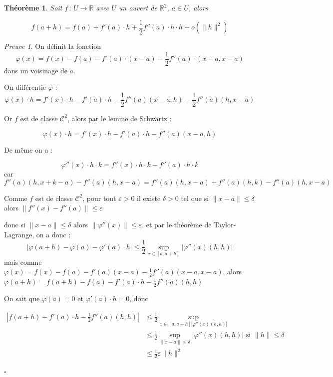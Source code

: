 \documentclass[]{article}
\newtheorem{mythm}{Théorème}
\theoremstyle{remark}
\newtheorem{myproof}{Preuve}
\theoremstyle{definition}
\newcommand{\cqfd}{
	\hfill$\square$
}
\newcommand{\funcshort}[3]{
#1 \, : \, #2 \longrightarrow #3
}
\begin{document}
\begin{mythm}
	Soit $\funcshort{f}{U}{\mathbb{R}}$ avec $U$ un ouvert de $\mathbb{R}^2$, $a \in U$, alors
	
	$$f(a+h) = f(a) + f'(a) \cdot h + \frac{1}{2} f''(a) \cdot h \cdot h + o(\|h\|^2)$$
\end{mythm}

\begin{myproof}
	On définit la fonction $$\varphi(x) = f(x) - f(a) - f'(a) \cdot (x-a) - \frac{1}{2} f''(a)\cdot(x-a, x-a)$$ dans un voisinage de $a$.
	
	On différentie $\varphi$ :
	$$\varphi(x) \cdot h = f'(x) \cdot h- f'(a) \cdot h - \frac{1}{2}f''(a)(x-a, h)- \frac{1}{2}f''(a)(h, x-a)$$
	
	Or $f$ est de classe $\mathcal{C}^2$, alors par le lemme de Schwartz :
	
	$$\varphi(x) \cdot h = f'(x) \cdot h- f'(a) \cdot h - f''(a)(x-a, h)$$
	
	De même on a :
	
	$$\varphi''(x)\cdot h \cdot k= f''(x) \cdot h \cdot k - f''(a)\cdot h \cdot k$$
	car $$f''(a) (h, x+k-a) - f''(a)(h, x-a) = f''(a)(h, x-a) + f''(a)(h, k) - f''(a)(h, x-a)$$
	
	Comme $f$ est de classe $\mathcal{C}^2$, pour tout $\varepsilon > 0$ il existe $\delta > 0$ tel que si $\|x-a\| \leqslant \delta$ alors $\|f''(x)-f''(a)\| \leqslant \varepsilon$
	
	donc si $\|x-a\|\leqslant \delta$ alors $\|\varphi''(x)\| \leqslant \varepsilon$, et par le théorème de Taylor-Lagrange, on a donc :
	$$|\varphi(a+h) - \varphi(a) - \varphi'(a)\cdot h| \leqslant \frac{1}{2} \sup_{x \in [a, a+h]} |\varphi''(x)(h, h)|$$
	mais comme $\varphi(x) = f(x) - f(a) - f'(a)(x-a) - \frac{1}{2}f''(a)(x-a, x-a)$, alors $\varphi(a+h) = f(a+h) - f(a) - f'(a) \cdot h - \frac{1}{2} f''(a)(h, h)$
	
	On sait que $\varphi(a)=0$ et $\varphi'(a) \cdot h = 0$, donc
	
	$$\begin{aligned}
		|f(a+h) - f'(a) \cdot h - \frac{1}{2} f''(a)(h, h)| &\leqslant \frac{1}{2} \sup_{x \in [a, a+h] |\varphi''(x)(h, h)|} \\
		& \leqslant \frac{1}{2} \sup_{\|x-a\| \leqslant \delta} |\varphi''(x)(h, h)| \text{ si } \|h\| \leqslant \delta \\
		&\leqslant \frac{1}{2} \varepsilon \|h\|^2
	\end{aligned}$$
	\cqfd
\end{myproof}
\end{document}
